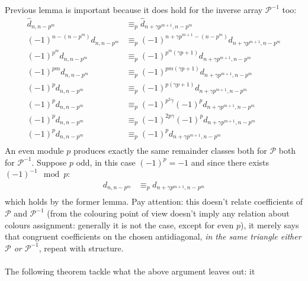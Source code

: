 \documentclass[11pt,a4paper]{article} %
\begin{document}
    Previous lemma is important because it does hold for the inverse array $\mathcal{P}^{-1}$ too:
    \begin{displaymath}
        \begin{split}
            \hat{d}_{n,n-p^{m}} &\equiv_{p} \hat{d}_{n+\gamma p^{m+1}, n-p^{m}} \\
            (-1)^{n-(n-p^{m})}d_{n,n-p^{m}} &\equiv_{p} (-1)^{n+\gamma p^{m+1}-(n-p^{m})}d_{n+\gamma p^{m+1}, n-p^{m}} \\
            (-1)^{p^{m}}d_{n,n-p^{m}} &\equiv_{p} (-1)^{p^{m}(\gamma p+1)}d_{n+\gamma p^{m+1}, n-p^{m}} \\
            (-1)^{p m}d_{n,n-p^{m}} &\equiv_{p} (-1)^{p{m}(\gamma p+1)}d_{n+\gamma p^{m+1}, n-p^{m}} \\
            (-1)^{p}d_{n,n-p^{m}} &\equiv_{p} (-1)^{p(\gamma p+1)}d_{n+\gamma p^{m+1}, n-p^{m}} \\
            (-1)^{p}d_{n,n-p^{m}} &\equiv_{p} (-1)^{p^2\gamma}(-1)^p d_{n+\gamma p^{m+1}, n-p^{m}} \\
            (-1)^{p}d_{n,n-p^{m}} &\equiv_{p} (-1)^{2p \gamma}(-1)^p d_{n+\gamma p^{m+1}, n-p^{m}} \\
            (-1)^{p}d_{n,n-p^{m}} &\equiv_{p} (-1)^p d_{n+\gamma p^{m+1}, n-p^{m}} \\
        \end{split}
    \end{displaymath}
    An even module $p$ produces exactly the same remainder classes both for $\mathcal{P}$ 
    both for $\mathcal{P}^{-1}$. Suppose $p$ odd, in this case $(-1)^{p} = -1$ and since there
    exists $(-1)^{-1}\mod p$:
    \begin{displaymath}
        \begin{split}
            d_{n,n-p^{m}} &\equiv_{p} d_{n+\gamma p^{m+1}, n-p^{m}} \\
        \end{split}
    \end{displaymath}
    which holds by the former lemma. Pay attention: this doesn't relate coefficients
    of $\mathcal{P}$ and $\mathcal{P}^{-1}$ (from the colouring point of view 
    doesn't imply any relation about colours assignment: generally it is not the case,
    except for even $p$), it merely says that 
    congruent coefficients on the chosen antidiagonal, \emph{in the same triangle
    either $\mathcal{P}$ or $\mathcal{P}^{-1}$}, repeat with structure.
    \\\\
    The following theorem tackle what the above argument leaves out: it 
\end{document}

